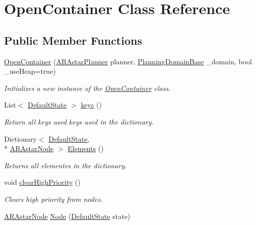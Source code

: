 \hypertarget{class_open_container}{\section{Open\-Container Class Reference}
\label{class_open_container}
}
\subsection*{Public Member Functions}
\begin{DoxyCompactItemize}
\item 
\hyperlink{class_open_container_a8fe6042f8f2b6e023c0ccbeb302c3145}{Open\-Container} (\hyperlink{class_a_r_astar_planner}{A\-R\-Astar\-Planner} planner, \hyperlink{class_planning_domain_base}{Planning\-Domain\-Base} \-\_\-domain, bool \-\_\-use\-Heap=true)
\begin{DoxyCompactList}\small\item\em Initializes a new instance of the \hyperlink{class_open_container}{Open\-Container} class. \end{DoxyCompactList}\item 
List$<$ \hyperlink{class_default_state}{Default\-State} $>$ \hyperlink{class_open_container_a9c2ac72d426256bd0f038b7375fb184e}{keys} ()
\begin{DoxyCompactList}\small\item\em Return all keys used keys used in the dictionary. \end{DoxyCompactList}\item 
Dictionary$<$ \hyperlink{class_default_state}{Default\-State}, \\*
\hyperlink{class_a_r_astar_node}{A\-R\-Astar\-Node} $>$ \hyperlink{class_open_container_ab7eb3e91880b999b099b54c4325dcec9}{Elements} ()
\begin{DoxyCompactList}\small\item\em Returns all elementes in the dictionary. \end{DoxyCompactList}\item 
void \hyperlink{class_open_container_a9f4b0b441dba986b7bf15d9359eb6900}{clear\-High\-Priority} ()
\begin{DoxyCompactList}\small\item\em Clears high priority from nodes. \end{DoxyCompactList}\item 
\hyperlink{class_a_r_astar_node}{A\-R\-Astar\-Node} \hyperlink{class_open_container_ad8c27e3618b6988966c38fe76cc87e65}{Node} (\hyperlink{class_default_state}{Default\-State} state)

\end{DoxyCompactItemize}
